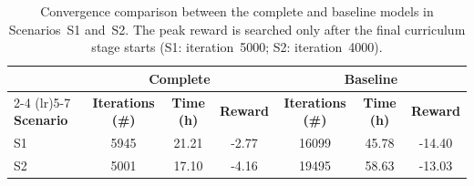 \begin{table}[htbp]
    \centering
    \caption{Convergence comparison between the complete and baseline models in Scenarios~S1 and~S2. The peak reward is searched only after the final curriculum stage starts (S1: iteration~5000; S2: iteration~4000).}
    \label{tab:convergence_comparison}
    \small
    \begin{tabular}{lcccccc}
        \toprule
        & \multicolumn{3}{c}{\textbf{Complete}}
        & \multicolumn{3}{c}{\textbf{Baseline}} \\
        \cmidrule(lr){2-4}
        \cmidrule(lr){5-7}
        \textbf{Scenario}
        & \textbf{Iterations (\#)}
        & \textbf{Time (h)}
        & \textbf{Reward}
        & \textbf{Iterations (\#)}
        & \textbf{Time (h)}
        & \textbf{Reward} \\
        \midrule
        S1 & 5945 & 21.21 & -2.77 & 16099 & 45.78 & -14.40 \\
        S2 & 5001 & 17.10 & -4.16 & 19495 & 58.63 & -13.03 \\
        \bottomrule
    \end{tabular}
\end{table}